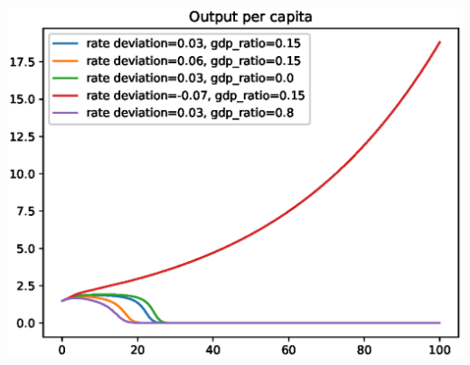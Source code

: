 \documentclass[12pt]{article}
\theoremstyle{definition}
\begin{document}
\begin{minipage}{0.8\linewidth}
\begin{framed}
\centering
\includegraphics[width=1\textwidth]{images/economy_1}
\end{framed}
\end{minipage}
\end{document}
